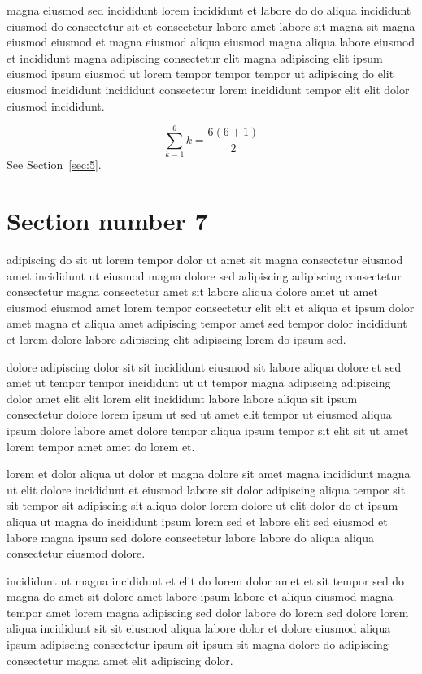 \documentclass{article}
\begin{document}
magna eiusmod sed incididunt lorem incididunt et labore do do aliqua incididunt eiusmod do consectetur sit et consectetur labore amet labore sit magna sit magna eiusmod eiusmod et magna eiusmod aliqua eiusmod magna aliqua labore eiusmod et incididunt magna adipiscing consectetur elit magna adipiscing elit ipsum eiusmod ipsum eiusmod ut lorem tempor tempor tempor ut adipiscing do elit eiusmod incididunt incididunt consectetur lorem incididunt tempor elit elit dolor eiusmod incididunt.

\begin{equation} \sum_{k=1}^{6} k = \frac{6(6+1)}{2} \end{equation}
See Section~\ref{sec:5}.

\section{Section number 7}\label{sec:7}
adipiscing do sit ut lorem tempor dolor ut amet sit magna consectetur eiusmod amet incididunt ut eiusmod magna dolore sed adipiscing adipiscing consectetur consectetur magna consectetur amet sit labore aliqua dolore amet ut amet eiusmod eiusmod amet lorem tempor consectetur elit elit et aliqua et ipsum dolor amet magna et aliqua amet adipiscing tempor amet sed tempor dolor incididunt et lorem dolore labore adipiscing elit adipiscing lorem do ipsum sed.

dolore adipiscing dolor sit sit incididunt eiusmod sit labore aliqua dolore et sed amet ut tempor tempor incididunt ut ut tempor magna adipiscing adipiscing dolor amet elit elit lorem elit incididunt labore labore aliqua sit ipsum consectetur dolore lorem ipsum ut sed ut amet elit tempor ut eiusmod aliqua ipsum dolore labore amet dolore tempor aliqua ipsum tempor sit elit sit ut amet lorem tempor amet amet do lorem et.

lorem et dolor aliqua ut dolor et magna dolore sit amet magna incididunt magna ut elit dolore incididunt et eiusmod labore sit dolor adipiscing aliqua tempor sit sit tempor sit adipiscing sit aliqua dolor lorem dolore ut elit dolor do et ipsum aliqua ut magna do incididunt ipsum lorem sed et labore elit sed eiusmod et labore magna ipsum sed dolore consectetur labore labore do aliqua aliqua consectetur eiusmod dolore.

incididunt ut magna incididunt et elit do lorem dolor amet et sit tempor sed do magna do amet sit dolore amet labore ipsum labore et aliqua eiusmod magna tempor amet lorem magna adipiscing sed dolor labore do lorem sed dolore lorem aliqua incididunt sit sit eiusmod aliqua labore dolor et dolore eiusmod aliqua ipsum adipiscing consectetur ipsum sit ipsum sit magna dolore do adipiscing consectetur magna amet elit adipiscing dolor.
\end{document}
